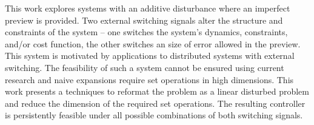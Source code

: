This work explores systems with an additive disturbance where an imperfect preview is provided. Two external switching signals alter the structure and constraints of the system -- one switches the system's dynamics, constraints, and/or cost function, the other switches an size of error allowed in the preview. This system is motivated by applications to distributed systems with external switching. The feasibility of such a system cannot be ensured using current research and naive expansions require set operations in high dimensions. This work presents a techniques to reformat the problem as a linear disturbed problem and reduce the dimension of the required set operations. The resulting controller is persistently feasible under all possible combinations of both switching signals.